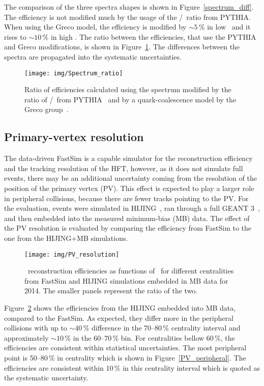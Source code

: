 The comparison of the three spectra shapes is shown in Figure~\ref{spectrum_diff}\@. The efficiency is not modified much by the usage of the \Lambdac/\dzero\ ratio from PYTHIA\@. When using the Greco model, the efficiency is modified by $\sim5\,\%$ in low \pt\ and it rises to $\sim10\,\%$ in high \pt\@. The ratio between the efficiencies, that use the PYTHIA and Greco modifications, is shown in Figure~\ref{spectrum_ratio}\@. The differences between the spectra are propagated into the systematic uncertainties.

\begin{figure}[!htb]
\centering
\texttt{[image: img/Spectrum\_ratio]}

\caption{\label{spectrum_ratio} Ratio of efficiencies calculated using the spectrum modified by the ratio of \Lambdac/\dzero\ from PYTHIA~\cite{PYTHIA8} and by a quark-coalescence model by the Greco group~\cite{GrecoCoalescence}.}
\end{figure}

\subsection{Primary-vertex resolution}

The data-driven FastSim is a capable simulator for the reconstruction efficiency and the tracking resolution of the HFT, however, as it does not simulate full events, there may be an additional uncertainty coming from the resolution of the position of the primary vertex (PV)\@. This effect is expected to play a larger role in peripheral collisions, because there are fewer tracks pointing to the PV\@. For the evaluation, events were simulated in HIJING~\cite{HIJING}, ran through a full GEANT 3~\cite{GEANT}, and then embedded into the measured minimum-bias (MB) data. The effect of the PV resolution is evaluated by comparing the efficiency from FastSim to the one from the HIJING+MB simulations.

\begin{figure}[!htb]
\centering
\texttt{[image: img/PV\_resolution]}

\caption{\label{PV_resolution} \Lambdac\ reconstruction efficiencies as functions of \pt\ for different centralities from FastSim and HIJING simulations embedded in MB data for 2014. The smaller panels represent the ratio of the two.}
\end{figure}

Figure~\ref{PV_resolution} shows the efficiencies from the HIJING embedded into MB data, compared to the FastSim. As expected, they differ more in the peripheral collisions with up to $\sim40\,\%$ difference in the 70--80$\,\%$ centrality interval and approximately $\sim10\,\%$ in the 60--70$\,\%$ bin. For centralities bellow 60$\,\%$, the efficiencies are consistent within statistical uncertainties. The most peripheral point is 50--80$\,\%$ in centrality which is shown in Figure~\ref{PV_peripheral}\@. The efficiencies are consistent within 10$\,\%$ in this centrality interval which is quoted as the systematic uncertainty.

